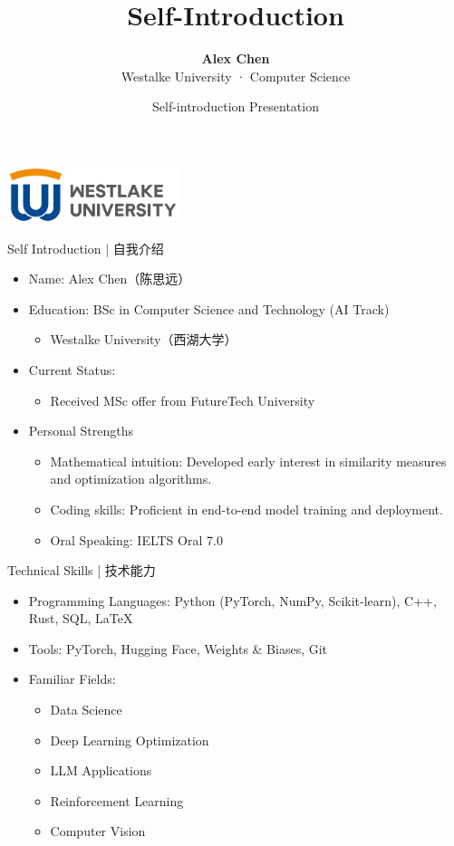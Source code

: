 \documentclass[11pt]{beamer}
\title{Self-Introduction}
\author[Alex Chen]{\textbf{Alex Chen} \\ \small Westalke University · Computer Science}
\institute[]{\textit{Westalke University} \\ Department of Computer Science and Technology}
\date{Self-introduction Presentation}
\begin{document}
\begin{frame}
    \titlepage
    \begin{center}
      \includegraphics[width=5cm]{./pic/logo3.png}
    \end{center}
\end{frame}

\begin{frame}{Self Introduction | 自我介绍}
\begin{itemize}
  \item Name: Alex Chen（陈思远）
  \item Education: BSc in Computer Science and Technology (AI Track)
    \begin{itemize}
      \item Westalke University（西湖大学）
    \end{itemize}
  \item Current Status:
    \begin{itemize}
      \item Received MSc offer from FutureTech University
    \end{itemize}
  \item Personal Strengths
    \begin{itemize}
      \item Mathematical intuition: Developed early interest in similarity measures and optimization algorithms.
      \item Coding skills: Proficient in end-to-end model training and deployment.
      \item Oral Speaking: IELTS Oral 7.0
    \end{itemize}
\end{itemize}
\end{frame}

\begin{frame}{Technical Skills | 技术能力}
\begin{itemize}
  \item Programming Languages: Python (PyTorch, NumPy, Scikit-learn), C++, Rust, SQL, LaTeX
  \item Tools: PyTorch, Hugging Face, Weights \& Biases, Git
  \item Familiar Fields:
    \begin{itemize}
      \item Data Science
      \item Deep Learning Optimization
      \item LLM Applications
      \item Reinforcement Learning
      \item Computer Vision
    \end{itemize}
\end{itemize}
\end{frame}
\end{document}
